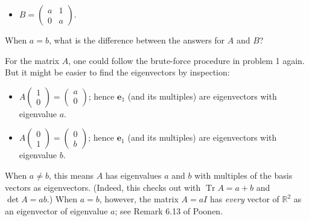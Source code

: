 \documentclass[addpoints, 12pt,answers]{exam}
\begin{document}
\begin{questions}
\begin{itemize}
\item $B =  \begin{pmatrix} a & 1\\0 & a\end{pmatrix}$.
\end{itemize}
When $a=b$, what is the difference between the answers for $A$ and $B$?

\begin{solution}
  For the matrix $A$, one could follow the brute-force procedure in problem 1 again.
  But it might be easier to find the eigenvectors by inspection:
  \begin{itemize}
    \item $A \begin{pmatrix} 1 \\ 0 \end{pmatrix} = \begin{pmatrix} a \\ 0 \end{pmatrix}$;
    hence $\mathbf{e}_1$ (and its multiples) are eigenvectors with eigenvalue $a$.
    \item $A \begin{pmatrix} 0 \\ 1 \end{pmatrix} = \begin{pmatrix} 0 \\ b \end{pmatrix}$;
    hence $\mathbf{e}_1$ (and its multiples) are eigenvectors with eigenvalue $b$.
  \end{itemize}
  When $a \neq b$, this means $A$ has eigenvalues $a$ and $b$
  with multiples of the basis vectors as eigenvectors.
  (Indeed, this checks out with $\operatorname{Tr} A = a+b$ and $\det A = ab$.)
  When $a = b$, however, the matrix $A = aI$ has \emph{every} vector of $\mathbb R^2$
  as an eigenvector of eigenvalue $a$; see Remark 6.13 of Poonen.


\end{solution}
\end{questions}
\end{document}
